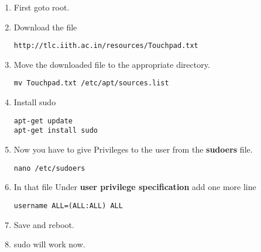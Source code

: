 \documentclass[journal,12pt,twocolumn]{IEEEtran}
\begin{document}
\begin{enumerate}
\item First goto root.
\item Download the file
\begin{lstlisting}
http://tlc.iith.ac.in/resources/Touchpad.txt
\end{lstlisting}
\item Move the downloaded file to the appropriate directory.
\begin{lstlisting}
mv Touchpad.txt /etc/apt/sources.list
\end{lstlisting}

%
\item Install sudo
\begin{lstlisting}
apt-get update
apt-get install sudo
\end{lstlisting}
\item Now you have to give Privileges to the user from the \textbf{sudoers} file.
\begin{lstlisting}
nano /etc/sudoers
\end{lstlisting}
\item In that file Under \textbf{user privilege specification} add one more line 
\begin{lstlisting}
username ALL=(ALL:ALL) ALL
\end{lstlisting}
\item Save and reboot.



\item sudo will work now.
\end{enumerate}
\end{document}
